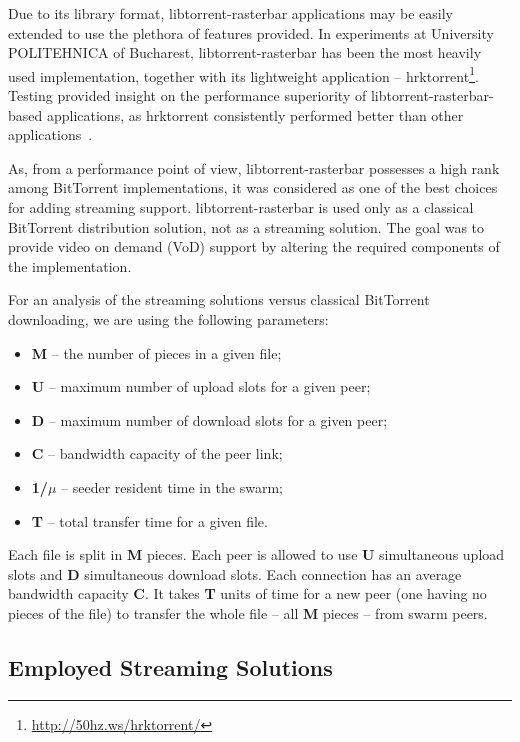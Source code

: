 Due to its library format, libtorrent-rasterbar applications may be easily
extended to use the plethora of features provided. In experiments at
University POLITEHNICA of Bucharest, libtorrent-rasterbar has been the most
heavily used implementation, together with its lightweight application --
hrktorrent\footnote{\url{http://50hz.ws/hrktorrent/}}. Testing provided insight on
the performance superiority of libtorrent-rasterbar-based applications, as
hrktorrent consistently performed better than other
applications~\cite{bt-pef}.

As, from a performance point of view, libtorrent-rasterbar possesses a high
rank among BitTorrent implementations, it was considered as one of the best
choices for adding streaming support. libtorrent-rasterbar is used only
as a classical BitTorrent distribution solution, not as a streaming solution.
The goal was to provide video on demand (VoD) support by altering the required
components of the implementation.

For an analysis of the streaming solutions versus classical BitTorrent
downloading, we are using the following parameters:

\begin{itemize}
  \item \textbf{M} -- the number of pieces in a given file;
  \item \textbf{U} -- maximum number of upload slots for a given peer;
  \item \textbf{D} -- maximum number of download slots for a given peer;
  \item \textbf{C} -- bandwidth capacity of the peer link;
  \item \textbf{1/$\mu$} -- seeder resident time in the swarm;
  \item \textbf{T} -- total transfer time for a given file.
\end{itemize}

Each file is split in \textbf{M} pieces. Each peer is allowed to use
\textbf{U} simultaneous upload slots and \textbf{D} simultaneous download
slots. Each connection has an average bandwidth capacity \textbf{C}. It takes
\textbf{T} units of time for a new peer (one having no pieces of the file) to
transfer the whole file -- all \textbf{M} pieces -- from swarm peers.

\subsection{Employed Streaming Solutions}
\label{subsec:multimedia-dist:libtorrent-streaming}

